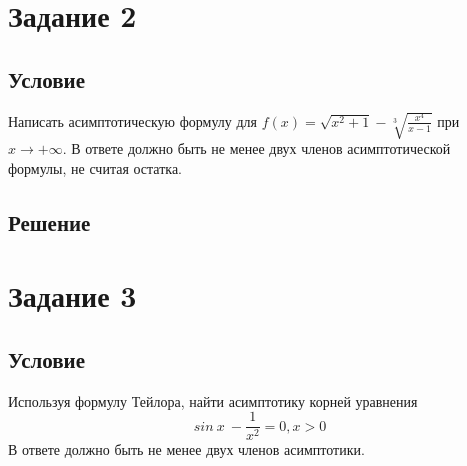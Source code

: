 \documentclass[a4paper, 14pt]{extarticle}
\begin{document}
\section{Задание 2}

\subsection{Условие}
Написать асимптотическую формулу для \(f(x) = \sqrt{x^2+1} - \sqrt[3]{\frac{x^4}{x-1}} \) при \(x \to +\infty\). В ответе должно быть не менее двух членов асимптотической формулы, не считая остатка. 

\subsection{Решение}


\newpage

\section{Задание 3}

\subsection{Условие}
Используя формулу Тейлора, найти асимптотику корней уравнения \[sin\: x \ - \frac{1}{x^2} = 0, x> 0\] В ответе должно быть не менее двух членов асимптотики.
\end{document}
